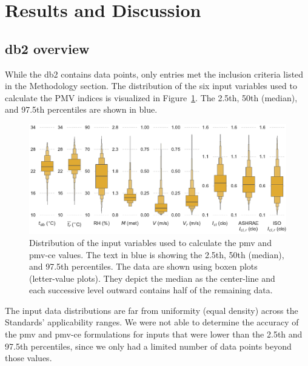 \section{Results and Discussion}\label{sec:results}

\subsection{\ac{db2} overview}\label{subsec:comfort-db-overview}
While the \ac{db2} contains  data points, only  entries met the inclusion criteria listed in the Methodology section.
The distribution of the six input variables used to calculate the PMV indices is visualized in Figure~\ref{fig:dist_input_data}.
The 2.5th, 50th (median), and 97.5th percentiles are shown in blue.
\begin{figure}[htb!]
    \centering
    \includegraphics[width=\textwidth]{figures/dist_input_data}
    \caption{Distribution of the input variables used to calculate the \ac{pmv} and \ac{pmv-ce} values.
    The text in blue is showing the 2.5th, 50th (median), and 97.5th percentiles.
    The data are shown using boxen plots (letter-value plots).
    They depict the median as the center-line and each successive level outward contains half of the remaining data.}
    \label{fig:dist_input_data}
\end{figure}
The input data distributions are far from uniformity (equal density) across the Standards' applicability ranges.
We were not able to determine the accuracy of the \ac{pmv} and \ac{pmv-ce} formulations for inputs that were lower than the 2.5th and 97.5th percentiles, since we only had a limited number of data points beyond those values.
